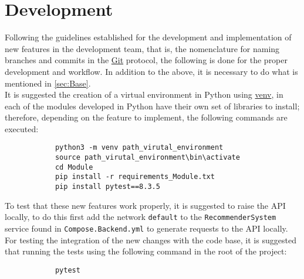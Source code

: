 \documentclass[12pt,a4paper]{article}
\begin{document}
    \newpage

    \section{Development}
    {
        Following the guidelines established for the development and implementation 
        of new features in the development team, that is, the nomenclature for naming 
        branches and commits in the \href{https://git-scm.com/}{Git} protocol, the 
        following is done for the proper development and workflow. In addition to 
        the above, it is necessary to do what is mentioned in \ref{sec:Base}.\\
    
        It is suggested the creation of a virtual environment in Python using 
        \href{https://docs.python.org/3/library/venv.html}{venv}, in each of 
        the modules developed in Python have their own set of libraries to 
        install; therefore, depending on the feature to implement, the following 
        commands are executed:

        \begin{verbatim}
            python3 -m venv path_virutal_environment 
            source path_virutal_environment\bin\activate
            cd Module
            pip install -r requirements_Module.txt
            pip install pytest==8.3.5
        \end{verbatim}

        To test that these new features work properly, it is suggested to raise the API 
        locally, to do this first add the network \verb*|default| to the \verb*|RecommenderSystem| 
        service found in \verb*|Compose.Backend.yml| to generate requests to the API locally.\\

        For testing the integration of the new changes with the code base, it is suggested 
        that running the tests using the following command in the root of the project:

        \begin{verbatim}
            pytest
        \end{verbatim}
    }

    \newpage
\end{document}
